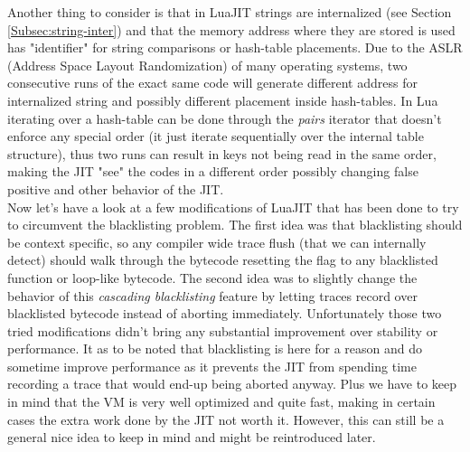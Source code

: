 Another thing to consider is that in LuaJIT strings are internalized (see
Section \ref{Subsec:string-inter}) and that the memory address where they are
stored is used has "identifier" for string comparisons or hash-table placements.
Due to the ASLR (Address Space Layout Randomization) of many operating systems,
two consecutive runs of the exact same code will generate different address for
internalized string and possibly different placement inside hash-tables. In Lua
iterating over a hash-table can be done through the \emph{pairs} iterator that
doesn't enforce any special order (it just iterate sequentially over the internal
table structure), thus two runs can result in keys not being read in the same order,
making the JIT "see" the codes in a different order possibly changing false positive
and other behavior of the JIT.\\

Now let's have a look at a few modifications of LuaJIT that has been done to try
to circumvent the blacklisting problem. The first idea was that blacklisting
should be context specific, so any compiler wide trace flush (that we can
internally detect) should walk through the bytecode resetting the flag to any
blacklisted function or loop-like bytecode. The second idea was to slightly
change the behavior of this \emph{cascading blacklisting} feature by letting
traces record over blacklisted bytecode instead of aborting immediately.
Unfortunately those two tried modifications didn't bring any substantial
improvement over stability or performance. It as to be noted that
blacklisting is here for a reason and do sometime improve performance as it
prevents the JIT from spending time recording a trace that would end-up being aborted
anyway. Plus we have to keep in mind that the VM is very well optimized and
quite fast, making in certain cases the extra work done by the JIT not worth it.
However, this can still be a general nice idea to keep in mind and might be
reintroduced later.
